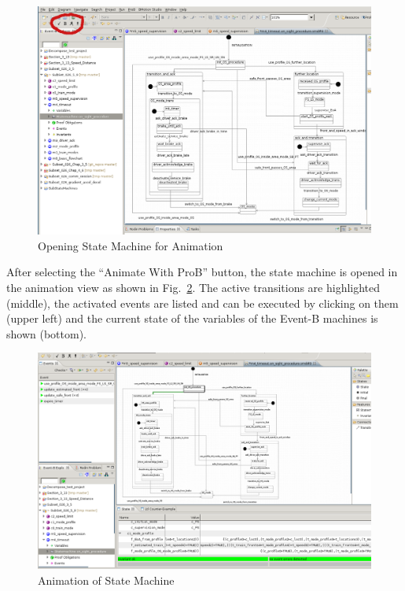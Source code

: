 \documentclass[10pt,a4paper]{article}
\begin{document}
\begin{figure}[H]
  \centering
  \includegraphics[width=.95\textwidth]{StateMachine1}
  \caption{Opening State Machine for Animation}
  \label{fig:statemachine-anim}
\end{figure}

After selecting the ``Animate With ProB'' button, the state machine is opened in
the animation view as shown in Fig.~\ref{fig:animation-machine}. The active
transitions are highlighted (middle), the activated events are listed and can be executed
by clicking on them (upper left) and the current state of the variables of the
Event-B machines is shown (bottom).

\begin{figure}[H]
  \centering
  \includegraphics[width=.95\textwidth]{StateMachine2}
  \caption{Animation of State Machine}
  \label{fig:animation-machine}
\end{figure}
\end{document}
